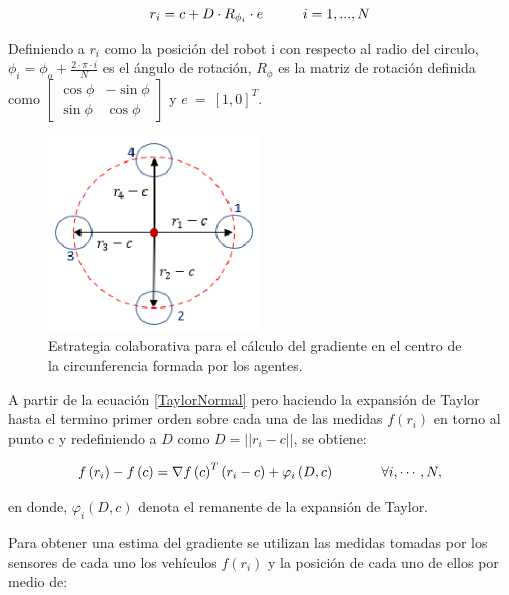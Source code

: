 \begin{equation}
	r_i = c + D\cdot{R}_{\phi_i}\cdot{e}\hspace{10mm}{i = 1,...,N}
\end{equation}

Definiendo a $r_{i}$ como la posición del robot i con respecto al radio del circulo, ${\phi }_{i}=\phi_{o}+\frac{2\cdot\pi\cdot{i}}{N}$ es el ángulo de rotación, $R_{\phi }$ es la matriz de rotación definida como $\left[ \begin{array}{cc} {\cos\phi} & -{\sin\phi } \\  {\sin\phi } & {\cos\phi } \end{array} \right]$ y  $e\ =\ {\left[1,0\right]}^T$.

\begin{figure}[htb]
\centering
\includegraphics[width=0.5\textwidth]{figures/p3.eps}
\caption{Estrategia colaborativa para el cálculo del gradiente en el centro de la circunferencia formada por los agentes.} \label{Estrategia_Colaborativa}
\end{figure}


A partir de la ecuación \ref{TaylorNormal} pero haciendo la expansión de Taylor hasta el termino primer orden sobre cada una de las medidas $f\left(r_i\right)$ en torno al punto c y redefiniendo a $D$ como $D=||r_i-c||$, se obtiene:

\begin{equation} \label{PuntoPartidaGradiente}
	f\left(r_i\right)-f\left(c\right)=\nabla{f\left(c\right)}^T\left(r_i-c\right)+\varphi_i\left(D,c\right)\hspace{12mm}\forall{i},\cdots,N,
\end{equation}

en donde, $\varphi_i\left(D,c\right)$ denota el remanente de la expansión de Taylor. 

Para obtener una estima del gradiente se utilizan las medidas tomadas por los sensores de cada uno los vehículos $f\left(r_i\right)$ y la posición de cada uno de ellos por medio de:

